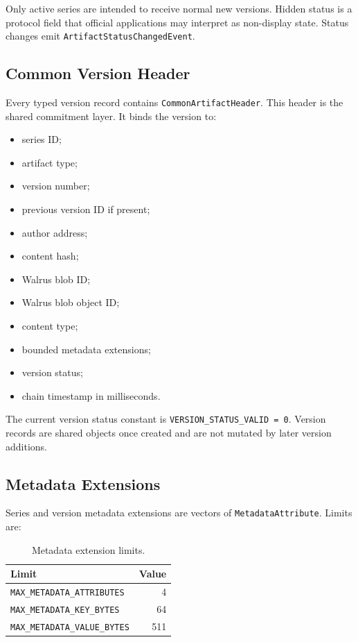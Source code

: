 \documentclass[11pt]{article}
\newcommand{\code}[1]{\texttt{#1}}
\begin{document}
Only active series are intended to receive normal new versions. Hidden status is a protocol field that official applications may interpret as non-display state. Status changes emit \code{ArtifactStatusChangedEvent}.

\subsection{Common Version Header}

Every typed version record contains \code{CommonArtifactHeader}. This header is the shared commitment layer. It binds the version to:

\begin{itemize}[leftmargin=*]
  \item series ID;
  \item artifact type;
  \item version number;
  \item previous version ID if present;
  \item author address;
  \item content hash;
  \item Walrus blob ID;
  \item Walrus blob object ID;
  \item content type;
  \item bounded metadata extensions;
  \item version status;
  \item chain timestamp in milliseconds.
\end{itemize}

The current version status constant is \code{VERSION\_STATUS\_VALID = 0}. Version records are shared objects once created and are not mutated by later version additions.

\subsection{Metadata Extensions}

Series and version metadata extensions are vectors of \code{MetadataAttribute}. Limits are:

\begin{table}[htbp]
\centering
\caption{Metadata extension limits.}
\begin{tabular}{lr}
\toprule
\textbf{Limit} & \textbf{Value} \\
\midrule
\code{MAX\_METADATA\_ATTRIBUTES} & 4 \\
\code{MAX\_METADATA\_KEY\_BYTES} & 64 \\
\code{MAX\_METADATA\_VALUE\_BYTES} & 511 \\
\bottomrule
\end{tabular}
\end{table}
\end{document}
